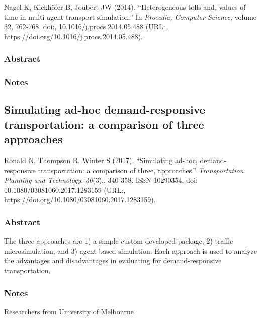 \documentclass[]{article}
\begin{document}
Nagel K, Kickhöfer B, Joubert JW (2014). ``Heterogeneous tolls and,
values of time in multi-agent transport simulation.'' In \emph{Procedia,
Computer Science}, volume 32, 762-768. doi:, 10.1016/j.procs.2014.05.488
(URL:, \url{https://doi.org/10.1016/j.procs.2014.05.488}).

\hypertarget{abstract-15}{%
\subsubsection{Abstract}\label{abstract-15}}

\hypertarget{notes-15}{%
\subsubsection{Notes}\label{notes-15}}

\hypertarget{simulating-ad-hoc-demand-responsive-transportation-a-comparison-of-three-approaches}{%
\subsection{Simulating ad-hoc demand-responsive transportation: a
comparison of three
approaches}\label{simulating-ad-hoc-demand-responsive-transportation-a-comparison-of-three-approaches}}

Ronald N, Thompson R, Winter S (2017). ``Simulating ad-hoc,
demand-responsive transportation: a comparison of three, approaches.''
\emph{Transportation Planning and Technology}, \emph{40}(3),, 340-358.
ISSN 10290354, doi: 10.1080/03081060.2017.1283159 (URL:,
\url{https://doi.org/10.1080/03081060.2017.1283159}).

\hypertarget{abstract-16}{%
\subsubsection{Abstract}\label{abstract-16}}

The three approaches are 1) a simple custom-developed package, 2)
traffic microsimulation, and 3) agent-based simulation. Each approach is
used to analyze the advantages and disadvantages in evaluating for
demand-responsive transportation.

\hypertarget{notes-16}{%
\subsubsection{Notes}\label{notes-16}}

Researchers from University of Melbourne
\end{document}
